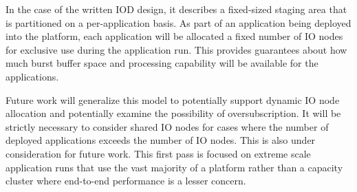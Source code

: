 \documentclass[conference]{IEEEtran}
\begin{document}
In the case of the written IOD design, it describes a fixed-sized staging area
that is partitioned on a per-application basis. As part of an application
being deployed into the platform, each application will be allocated a fixed
number of IO nodes for exclusive use during the application run. This provides
guarantees about how much burst buffer space and processing capability will be
available for the applications.


Future work will generalize this model to potentially support dynamic IO node
allocation and potentially examine the possibility of oversubscription. It will
be strictly necessary to consider shared IO nodes for cases where the number
of deployed applications exceeds the number of IO nodes. This is also under
consideration for future work. This first pass is focused on extreme scale
application runs that use the vast majority of a platform rather than a
capacity cluster where end-to-end performance is a lesser concern.

%
\end{document}
